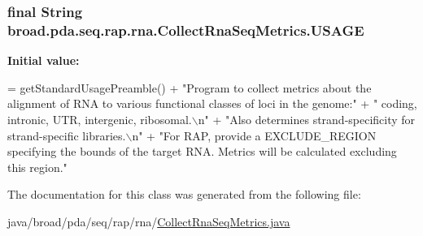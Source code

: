 \hypertarget{classbroad_1_1pda_1_1seq_1_1rap_1_1rna_1_1_collect_rna_seq_metrics_ac9fff20f8e876587194d968240cf9a20}{
\subsubsection[{U\+S\+A\+G\+E}]{\setlength{\rightskip}{0pt plus 5cm}final String broad.\+pda.\+seq.\+rap.\+rna.\+Collect\+Rna\+Seq\+Metrics.\+U\+S\+A\+G\+E}}\label{classbroad_1_1pda_1_1seq_1_1rap_1_1rna_1_1_collect_rna_seq_metrics_ac9fff20f8e876587194d968240cf9a20}
{\bfseries Initial value\+:}
\begin{DoxyCode}
= getStandardUsagePreamble() +
            \textcolor{stringliteral}{"Program to collect metrics about the alignment of RNA to various functional classes of loci in
       the genome:"} +
            \textcolor{stringliteral}{" coding, intronic, UTR, intergenic, ribosomal.\(\backslash\)n"} +
            \textcolor{stringliteral}{"Also determines strand-specificity for strand-specific libraries.\(\backslash\)n"} +
            \textcolor{stringliteral}{"For RAP, provide a EXCLUDE\_REGION specifying the bounds of the target RNA.  Metrics will be
       calculated excluding this region."}
\end{DoxyCode}


The documentation for this class was generated from the following file\+:\begin{DoxyCompactItemize}
\item 
java/broad/pda/seq/rap/rna/\hyperlink{_collect_rna_seq_metrics_8java}{Collect\+Rna\+Seq\+Metrics.\+java}\end{DoxyCompactItemize}
